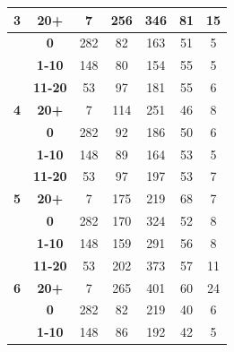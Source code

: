 \begin{table}
{\begin{tabular}{|c@{~}|c@{~}|c@{~}|c@{~}|c@{~}|c@{~}|c|}
\multirow{-4}{*}{\textbf{3}} & \textbf{20+} & 7 & 256 & \cellcolor[HTML]{C0C0C0}346 & \cellcolor[HTML]{C0C0C0}81 & 15 \\ \hline
 & \textbf{0} & 282 & \cellcolor[HTML]{C0C0C0}82 & \cellcolor[HTML]{C0C0C0}163 & \cellcolor[HTML]{C0C0C0}51 & \cellcolor[HTML]{C0C0C0}5 \\ \cline{2-7} 
 & \textbf{1-10} & 148 & \cellcolor[HTML]{C0C0C0}80 & \cellcolor[HTML]{C0C0C0}154 & \cellcolor[HTML]{C0C0C0}55 & \cellcolor[HTML]{C0C0C0}5 \\ \cline{2-7} 
 & \textbf{11-20} & 53 & 97 & \cellcolor[HTML]{C0C0C0}181 & \cellcolor[HTML]{C0C0C0}55 & \cellcolor[HTML]{C0C0C0}6 \\ \cline{2-7} 
\multirow{-4}{*}{\textbf{4}} & \textbf{20+} & 7 & 114 & \cellcolor[HTML]{C0C0C0}251 & \cellcolor[HTML]{C0C0C0}46 & \cellcolor[HTML]{C0C0C0}8 \\ \hline
 & \textbf{0} & 282 & \cellcolor[HTML]{C0C0C0}92 & \cellcolor[HTML]{C0C0C0}186 & \cellcolor[HTML]{C0C0C0}50 & \cellcolor[HTML]{C0C0C0}6 \\ \cline{2-7} 
 & \textbf{1-10} & 148 & \cellcolor[HTML]{C0C0C0}89 & \cellcolor[HTML]{C0C0C0}164 & \cellcolor[HTML]{C0C0C0}53 & \cellcolor[HTML]{C0C0C0}5 \\ \cline{2-7} 
 & \textbf{11-20} & 53 & 97 & \cellcolor[HTML]{C0C0C0}197 & \cellcolor[HTML]{C0C0C0}53 & 7 \\ \cline{2-7} 
\multirow{-4}{*}{\textbf{5}} & \textbf{20+} & 7 & 175 & \cellcolor[HTML]{C0C0C0}219 & \cellcolor[HTML]{C0C0C0}68 & 7 \\ \hline
 & \textbf{0} & 282 & \cellcolor[HTML]{C0C0C0}170 & \cellcolor[HTML]{C0C0C0}324 & \cellcolor[HTML]{C0C0C0}52 & \cellcolor[HTML]{C0C0C0}8 \\ \cline{2-7} 
 & \textbf{1-10} & 148 & \cellcolor[HTML]{C0C0C0}159 & \cellcolor[HTML]{C0C0C0}291 & \cellcolor[HTML]{C0C0C0}56 & \cellcolor[HTML]{C0C0C0}8 \\ \cline{2-7} 
 & \textbf{11-20} & 53 & 202 & \cellcolor[HTML]{C0C0C0}373 & \cellcolor[HTML]{C0C0C0}57 & \cellcolor[HTML]{C0C0C0}11 \\ \cline{2-7} 
\multirow{-4}{*}{\textbf{6}} & \textbf{20+} & 7 & 265 & \cellcolor[HTML]{C0C0C0}401 & \cellcolor[HTML]{C0C0C0}60 & \cellcolor[HTML]{C0C0C0}24 \\ \hline
 & \textbf{0} & 282 & \cellcolor[HTML]{C0C0C0}82 & 219 & \cellcolor[HTML]{C0C0C0}40 & \cellcolor[HTML]{C0C0C0}6 \\ \cline{2-7} 
 & \textbf{1-10} & 148 & \cellcolor[HTML]{C0C0C0}86 & \cellcolor[HTML]{C0C0C0}192 & \cellcolor[HTML]{C0C0C0}42 & \cellcolor[HTML]{C0C0C0}5 \\ \cline{2-7} 

\end{tabular}}
\end{table}
